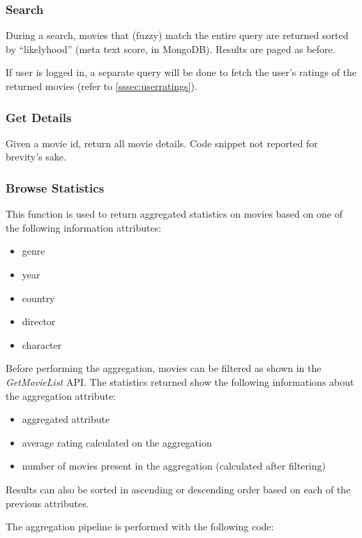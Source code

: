 \documentclass[11pt]{article}
\begin{document}
\subsubsection{Search}
During a search, movies that (fuzzy) match the entire query are returned sorted
by ``likelyhood'' (meta text score, in MongoDB). Results are paged as before.

If user is logged in, a separate query will be done to fetch the user's ratings of the returned movies (refer to \ref{sssec:userratings}).



\subsubsection{Get Details}
Given a movie id, return all movie details. Code snippet not reported for brevity's sake.

\subsubsection{Browse Statistics}
This function is used to return aggregated statistics on movies based on one of the following information attributes:
\begin{itemize}
	\item genre
	\item year
	\item country
	\item director
	\item character
\end{itemize}
Before performing the aggregation, movies can be filtered as shown in the \textit{GetMovieList} API.
The statistics returned show the following informations about the aggregation attribute:
\begin{itemize}
	\item aggregated attribute
	\item average rating calculated on the aggregation
	\item number of movies present in the aggregation (calculated after filtering)
\end{itemize}
Results can also be sorted in ascending or descending order based on each of the previous attributes.

The aggregation pipeline is performed with the following code:


\end{document}
